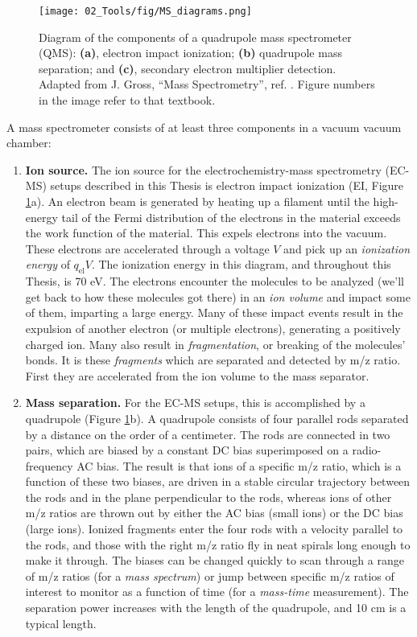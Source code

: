 \begin{figure}[h!]
	\texttt{[image: 02\_Tools/fig/MS\_diagrams.png]}
	\caption{Diagram of the components of a quadrupole mass spectrometer (QMS): \textbf{(a)}, electron impact ionization; \textbf{(b)} quadrupole mass separation; and \textbf{(c)},  secondary electron multiplier detection. Adapted from J. Gross, ``Mass Spectrometry'', ref. . Figure numbers in the image refer to that textbook.}
	\label{fig:MS}
\end{figure}

A mass spectrometer consists of at least three components in a vacuum vacuum chamber\cite{Gross2007}: 

\begin{enumerate}
	\item \textbf{Ion source.} The ion source for the electrochemistry-mass spectrometry (EC-MS) setups described in this Thesis is electron impact ionization (EI, Figure \ref{fig:MS}a). An electron beam is generated by heating up a filament until the high-energy tail of the Fermi distribution of the electrons in the material exceeds the work function of the material. This expels electrons into the vacuum. These electrons are accelerated through a voltage $V$ and pick up an \textit{ionization energy} of $q_\text{el}V$. The ionization energy in this diagram, and throughout this Thesis, is 70 eV. The electrons encounter the molecules to be analyzed (we'll get back to how these molecules got there) in an \textit{ion volume} and impact some of them, imparting a large energy. Many of these impact events result in the expulsion of another electron (or multiple electrons), generating a positively charged ion. Many also result in \textit{fragmentation}, or breaking of the molecules' bonds. It is these \textit{fragments} which are separated and detected by m/z ratio. First they are accelerated from the ion volume to the mass separator.
	
	\item \textbf{Mass separation.} For the EC-MS setups, this is accomplished by a quadrupole (Figure \ref{fig:MS}b). A quadrupole consists of four parallel rods separated by a distance on the order of a centimeter. The rods are connected in two pairs, which are biased by a constant DC bias superimposed on a radio-frequency AC bias. The result is that ions of a specific m/z ratio, which is a function of these two biases, are driven in a stable circular trajectory between the rods and in the plane perpendicular to the rods, whereas ions of other m/z ratios are thrown out by either the AC bias (small ions) or the DC bias (large ions). Ionized fragments enter the four rods with a velocity parallel to the rods, and those with the right m/z ratio fly in neat spirals long enough to make it through. The biases can be changed quickly to scan through a range of m/z ratios (for a \textit{mass spectrum}) or jump between specific m/z ratios of interest to monitor as a function of time (for a \textit{mass-time} measurement). The separation power increases with the length of the quadrupole, and 10 cm is a typical length. 
	

\end{enumerate}

